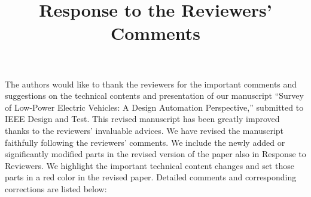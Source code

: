 \documentclass[onecolumn]{IEEEconf}
\title{Response to the Reviewers' Comments}
\begin{document}
\maketitle

The authors would like to thank the reviewers for the important comments and suggestions on the technical contents and presentation of our manuscript ``Survey of Low-Power Electric Vehicles: A Design Automation Perspective,'' submitted to IEEE Design and Test. This revised manuscript has been greatly improved thanks to the reviewers’ invaluable advices. We have revised the manuscript faithfully following the reviewers’ comments. We include the newly added or significantly modified parts in the revised version of the paper also in Response to Reviewers. We highlight the important technical content changes and set those parts in a red color in the revised paper. Detailed comments and corresponding corrections are listed below:\\
\end{document}
